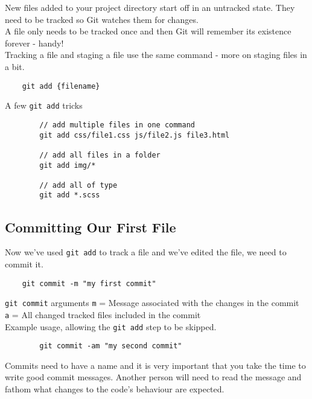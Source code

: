 New files added to your project directory start off in an untracked state. They need to be tracked so Git watches them for changes.
\\

A file only needs to be tracked once and then Git will remember its existence forever - handy!
\\

Tracking a file and staging a file use the same command - more on staging files in a bit.

\begin{verbatim}
    git add {filename}
\end{verbatim}

\begin{infobox}{A few \texttt{git add} tricks}
    \begin{verbatim}
        // add multiple files in one command
        git add css/file1.css js/file2.js file3.html

        // add all files in a folder
        git add img/*

        // add all of type
        git add *.scss
    \end{verbatim}
\end{infobox}


\subsection{Committing Our First File}

Now we've used \texttt{git add} to track a file and we've edited the file, we need to commit it.

\begin{verbatim}
    git commit -m "my first commit"
\end{verbatim}

\begin{infobox}{\texttt{git commit} arguments}
    \texttt{m} = Message associated with the changes in the commit
    \\
    \texttt{a} = All changed tracked files included in the commit
    \\

    Example usage, allowing the \texttt{git add} step to be skipped.

    \begin{verbatim}
        git commit -am "my second commit"
    \end{verbatim}
\end{infobox}

Commits need to have a name and it is very important that you take the time to write good commit messages. Another person will need to read the message and fathom what changes to the code's behaviour are expected.
\\

